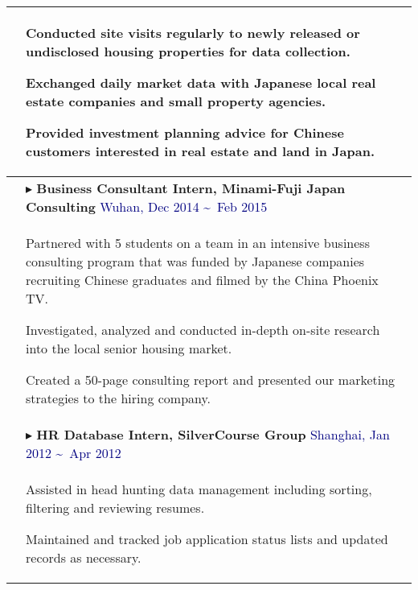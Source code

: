 \documentclass[$if(fontsize)$$fontsize$,$endif$$if(lang)$$babel-lang$,$endif$$if(papersize)$$papersize$paper,$endif$$for(classoption)$$classoption$$sep$,$endfor$]{$documentclass$}
\renewenvironment{itemize}{
  \begin{list}{}{
    \setlength{\leftmargin}{1em}  %
  }
}{
  \end{list}
}
\begin{document}
\begin{tabular}{>{\centering}p{2.5cm}|p{16.5cm}}
    & \vspace{-2mm}
      \begin{itemize}
        \item[\textbullet] Conducted site visits regularly to newly released or undisclosed housing properties for data collection.
        \item[\textbullet] Exchanged daily market data with Japanese local real estate companies and small property agencies.
        \item[\textbullet] Provided investment planning advice for Chinese customers interested in real estate and land in Japan.
      \vspace{-4mm}
      \end{itemize}\\

    \midrule
    \multirow{11}{*}{\small\textbf{INTERNSHIP}}
    & \(\blacktriangleright\) \textbf{Business Consultant Intern, Minami-Fuji Japan Consulting} \hfill \textcolor{Navy}{Wuhan, Dec 2014 \textasciitilde\ Feb 2015}\\
    & \vspace{-2mm}
      \begin{itemize}
        \item[\textbullet] Partnered with 5 students on a team in an intensive business consulting program that was funded by Japanese companies recruiting Chinese graduates and filmed by the China Phoenix TV.
        \item[\textbullet] Investigated, analyzed and conducted in-depth on-site research into the local senior housing market.
        \item[\textbullet] Created a 50-page consulting report and presented our marketing strategies to the hiring company.
      \vspace{-4mm}
      \end{itemize}\\
    & \vspace{-3mm}
    \(\blacktriangleright\) \textbf{HR Database Intern, SilverCourse Group} \hfill \textcolor{Navy}{Shanghai, Jan 2012 \textasciitilde\ Apr 2012}\\
    & \vspace{-2mm}
      \begin{itemize}
        \item[\textbullet] Assisted in head hunting data management including sorting, filtering and reviewing resumes.
        \item[\textbullet] Maintained and tracked job application status lists and updated records as necessary.

\end{itemize}
\end{tabular}
\end{document}
